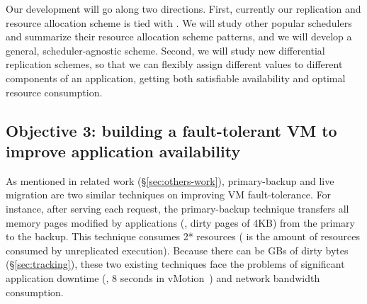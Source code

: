 
 Our \tripod development will go along two directions. 
First, currently our replication and resource allocation scheme is tied with 
\mesos. We will study other popular schedulers and summarize their 
resource allocation scheme patterns, and we will develop a general, 
scheduler-agnostic scheme. Second, we will study new differential replication 
schemes, so that we can flexibly assign different  values to different 
components of an application, getting both satisfiable availability and optimal 
resource consumption.

\vspace{-.15in}\subsection{Objective 3: building a fault-tolerant VM to improve 
application availability}\label{sec:vm}\vspace{-.075in}



As mentioned in related work (\S\ref{sec:others-work}), primary-backup and live 
migration are two similar techniques on improving VM fault-tolerance. For 
instance, after serving each request, the primary-backup technique transfers all 
memory pages modified by applications (\ie, dirty pages of 4KB) from the 
primary to the backup. This technique consumes 2* resources ( is 
the amount of resources consumed by unreplicated execution). Because there can 
be GBs of dirty bytes (\S\ref{sec:tracking}), these two existing techniques 
face the problems of significant application downtime (\eg, 8 seconds in 
vMotion~\cite{vmotion:atc05}) and network bandwidth consumption.

